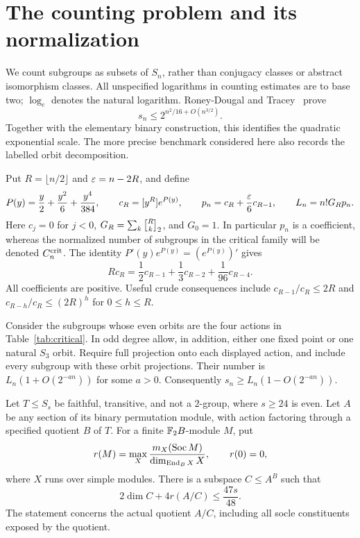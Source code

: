 \section{The counting problem and its normalization}
\label{sec:intro}
We count subgroups as subsets of $S_n$, rather than conjugacy classes
or abstract isomorphism classes. All unspecified logarithms in counting
estimates are to base two; $\log_e$ denotes the natural logarithm.
Roney-Dougal and Tracey~\cite{RoneyDougalTracey2025} prove
\begin{equation}\label{eq:coarse}
 s_n\leq 2^{n^2/16+O(n^{3/2})}.
\end{equation}
Together with the elementary binary construction, this identifies the
quadratic exponential scale. The more precise benchmark considered here
also records the labelled orbit decomposition.

Put $R=\lfloor n/2\rfloor$ and $\varepsilon=n-2R$, and define
\begin{equation}\label{eq:normalization}
 P(y)=\frac y2+\frac{y^2}6+\frac{y^4}{384},\qquad
 c_R=[y^R]e^{P(y)},\qquad
 p_n=c_R+\frac{\varepsilon}{6}c_{R-1},\qquad L_n=n!G_Rp_n.
\end{equation}
Here $c_j=0$ for $j<0$, $G_R=\sum_k\gauss Rk2$, and $G_0=1$.
In particular $p_n$ is a coefficient, whereas the normalized number of
subgroups in the critical family will be denoted $C_n^{\mathrm{crit}}$.
The identity $P'(y)e^{P(y)}=(e^{P(y)})'$ gives
\begin{equation}\label{eq:coefficient-recurrence}
 R c_R=\frac12c_{R-1}+\frac13c_{R-2}+\frac1{96}c_{R-4}.
\end{equation}
All coefficients are positive. Useful crude consequences include
$c_{R-1}/c_R\leq2R$ and
$c_{R-h}/c_R\leq(2R)^h$ for $0\leq h\leq R$.

\begin{theorem}\label{thm:critical-intro}
Consider the subgroups whose even orbits are the four actions in
Table~\ref{tab:critical}. In odd degree allow, in addition, either one
fixed point or one natural $S_3$ orbit. Require full projection onto
each displayed action, and include every subgroup with these orbit
projections. Their number is $L_n(1+O(2^{-a n}))$ for some $a>0$.
Consequently $s_n\geq L_n(1-O(2^{-a n}))$.
\end{theorem}

\begin{theorem}\label{thm:capacity-intro}
Let $T\leq S_s$ be faithful, transitive, and not a $2$-group, where
$s\geq24$ is even. Let $A$ be any section of its binary permutation
module, with action factoring through a specified quotient $B$ of $T$.
For a finite $\mathbb F_2B$-module $M$, put
\[
 r(M)=\max_X\frac{m_X(\operatorname{Soc} M)}{\dim_{\operatorname{End}_BX}X},\qquad r(0)=0,
\]
where $X$ runs over simple modules. There is a subspace $C\leq A^B$
such that
\begin{equation}\label{eq:capacity-intro}
 2\dim C+4r(A/C)\leq\frac{47s}{48}.
\end{equation}
The statement concerns the actual quotient $A/C$, including all socle
constituents exposed by the quotient.
\end{theorem}

